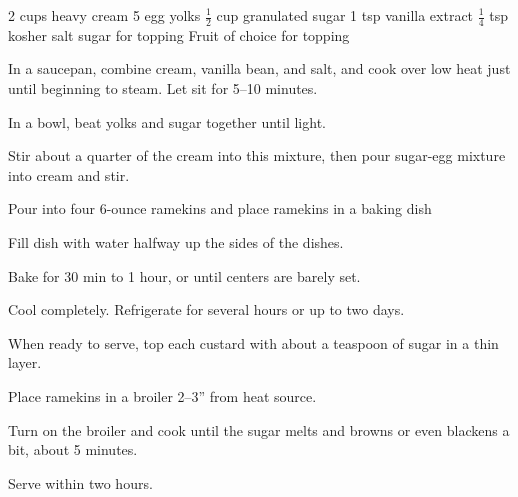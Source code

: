 \dishtype{\dessert}
\dishother{\vegetarian}
\begin{ingreds}
    2 cups heavy cream
    5 egg yolks
    $\frac{1}{2}$ cup granulated sugar
    1 tsp vanilla extract
    $\frac{1}{4}$ tsp kosher salt
    sugar for topping
    Fruit of choice for topping
\end{ingreds}
\begin{method}
    In a saucepan, combine cream, vanilla bean, and salt, and cook over low heat just until beginning to steam. Let sit for 5--10 minutes.\par
	In a bowl, beat yolks and sugar together until light.\par
    Stir about a quarter of the cream into this mixture, then pour sugar-egg mixture into cream and stir.\par
    Pour into four 6-ounce ramekins and place ramekins in a baking dish\par
    Fill dish with water halfway up the sides of the dishes.\par
    Bake for 30 min to 1 hour, or until centers are barely set.\par
    Cool completely. Refrigerate for several hours or up to two days.\par
	When ready to serve, top each custard with about a teaspoon of sugar in a thin layer.\par
    Place ramekins in a broiler 2--3'' from heat source.\par
    Turn on the broiler and cook until the sugar melts and browns or even blackens a bit, about 5 minutes.\par
    Serve within two hours.
\end{method}